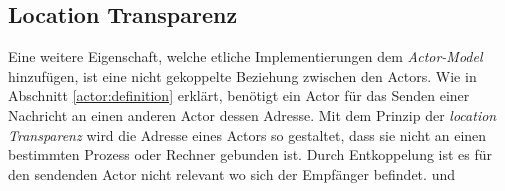 \subsection{Location Transparenz}\label{actor:locationTransparency}
Eine weitere Eigenschaft, welche etliche Implementierungen dem \textit{Actor-Model} hinzufügen, ist eine nicht gekoppelte Beziehung zwischen den Actors. Wie in Abschnitt \ref{actor:definition} erklärt, benötigt ein Actor für das Senden einer Nachricht an einen anderen Actor dessen Adresse. Mit dem Prinzip der \textit{location Transparenz} wird die Adresse eines Actors so gestaltet, dass sie nicht an einen bestimmten Prozess oder Rechner gebunden ist. Durch Entkoppelung ist es für den sendenden Actor nicht relevant wo sich der Empfänger befindet. \citep{Vernon2015ReactiveAkka} und \citep{sargent2016play}

